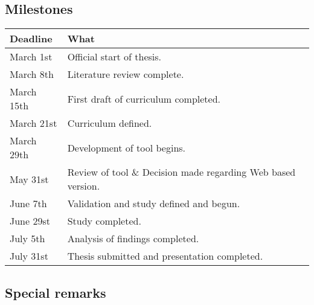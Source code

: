 \documentclass{task_description}
\begin{document}
\subsection*{Milestones}

\begin{tabular}{lp{10cm}}
Deadline & What \\
\hline\noalign{\smallskip}
March 1st & Official start of thesis. \\
March 8th  & Literature review complete. \\
March 15th & First draft of curriculum completed. \\
March 21st & Curriculum defined. \\
March 29th & Development of tool begins. \\
May 31st  & Review of tool \& Decision made regarding Web based version. \\
June 7th & Validation and study defined and begun. \\
June 29st  & Study completed. \\
July 5th  & Analysis of findings completed. \\
July 31st & Thesis submitted and presentation completed. \\
\end{tabular}






\subsection*{Special remarks}
\end{document}

